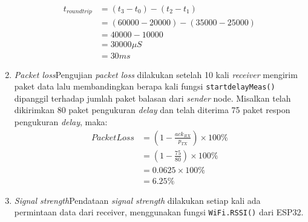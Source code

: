 \begin{enumerate}
	\begin{equation}
		\begin{aligned}
			t_{roundtrip} &= (t_3 - t_0) - (t_2 - t_1)\\
			&= (60000 - 20000) - (35000 - 25000)\\
			&= 40000 - 10000\\
			&= 30000 \mu S\\
			&= 30 ms
		\end{aligned}
	\end{equation}
	\item \textit{Packet loss}\newline Pengujian \textit{packet loss} dilakukan setelah 10 kali \textit{receiver} mengirim paket data lalu membandingkan berapa kali fungsi \verb|startdelayMeas()| dipanggil terhadap jumlah paket balasan dari \textit{sender} node.
	\newline Misalkan telah dikirimkan 80 paket pengukuran \textit{delay} dan telah diterima 75 paket respon pengukuran \textit{delay}, maka:
	\begin{equation}
		\begin{aligned}
			Packet Loss &= (1-\frac{ack_{RX}}{p_{TX}})\times 100\% \\
			&= (1 - \frac{75}{80}) \times 100 \% \\
			&= 0.0625 \times 100 \% \\
			&= 6.25 \%
		\end{aligned}
	\end{equation}
	\item \textit{Signal strength}\newline Pendataan \textit{signal strength} dilakukan setiap kali ada permintaan data dari receiver, menggunakan fungsi \verb|WiFi.RSSI()| dari ESP32.
\end{enumerate}